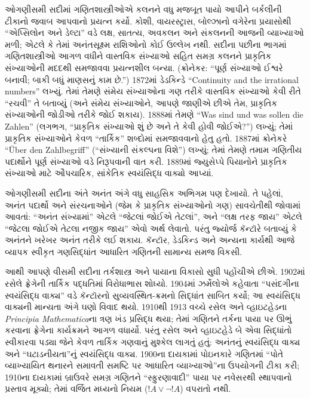 ઓગણીસમી સદીમાં ગણિતશાસ્ત્રીઓએ કલનને વધુ મજબૂત પાયો
આપીને બર્કલીની ટીકાનો જવાબ આપવાનો પ્રયત્ન કર્યો.
કોશી, વાયરસ્ટ્રાસ, બોલ્ઝાનો વગેરેના પ્રયાસોથી
``એપ્સિલોન અને ડેલ્ટા'' વડે લક્ષ, સાતત્ય,
અવકલન અને સંકલનની આજની વ્યાખ્યાઓ મળી; એટલે કે
તેમાં અનંતસૂક્ષ્મ રાશિઓનો કોઈ ઉલ્લેખ નથી. સદીના
પછીના ભાગમાં ગણિતશાસ્ત્રીઓ આગળ વધીને વાસ્તવિક
સંખ્યાઓ સહિત સમગ્ર કલનને પ્રાકૃતિક સંખ્યાઓની મદદથી
સમજાવવા પ્રયત્નશીલ બન્યા. (ક્રોનેકર: ``પૂર્ણ સંખ્યાઓ
ઈશ્વરે બનાવી; બાકી બધું માણસનું કામ છે.'') 1872માં
ડેડકિન્ડે ``Continuity and the irrational numbers''
લખ્યું. તેમાં તેમણે સંમેય સંખ્યાઓના ગણ તરીકે વાસ્તવિક
સંખ્યાઓ કેવી રીતે ``રચવી'' તે બતાવ્યું (અને સંમેય
સંખ્યાઓને, આપણે જાણીએ છીએ તેમ, પ્રાકૃતિક સંખ્યાઓની
જોડીઓ તરીકે જોઈ શકાય). 1888માં તેમણે ``Was sind und
was sollen die Zahlen'' (લગભગ, ``પ્રાકૃતિક સંખ્યાઓ
શું છે અને તે કેવી હોવી જોઈએ?'') લખ્યું; તેમાં
પ્રાકૃતિક સંખ્યાઓને કેવળ ``તાર્કિક'' શબ્દોમાં સમજાવવાનો
હેતુ હતો. 1887માં ક્રોનેકરે ``\"Uber den Zahlbegriff''
(``સંખ્યાની સંકલ્પના વિશે'') લખ્યું; તેમાં તેમણે તમામ
ગણિતીય પદાર્થોને પૂર્ણ સંખ્યાઓ વડે નિરૂપવાની વાત કરી.
1889માં જ્યુસેપ્પે પિયાનોને પ્રાકૃતિક સંખ્યાઓ માટે
ઔપચારિક, સાંકેતિક સ્વયંસિદ્ધ વાક્યો આપ્યાં.

ઓગણીસમી સદીના અંતે અનંત અંગે વધુ સાહસિક અભિગમ પણ
દેખાયો. તે પહેલાં, અનંત પદાર્થો અને સંરચનાઓને
(જેમ કે પ્રાકૃતિક સંખ્યાઓનો ગણ) સાવચેતીથી જોવામાં
આવતાં: ``અનંત સંખ્યામાં'' એટલે ``જેટલાં જોઈએ તેટલાં'',
અને ``લક્ષ તરફ જાય'' એટલે ``જેટલા જોઈએ તેટલા નજીક
જાય'' એવો અર્થ લેવાતો. પરંતુ જ્યોર્જ કૅન્ટૉરે બતાવ્યું
કે અનંતને ખરેખર અનંત તરીકે લઈ શકાય. કૅન્ટૉર,
ડેડકિન્ડ અને અન્યના કાર્યથી આજે વ્યાપક સ્વીકૃત
ગણસિદ્ધાંત આધારિત ગણિતની સામાન્ય સમજ વિકસી.

આથી આપણે વીસમી સદીના તર્કશાસ્ત્ર અને પાયાના વિકાસો
સુધી પહોંચીએ છીએ. 1902માં રસેલે ફ્રેગેની તાર્કિક
પદ્ધતિમાં વિરોધાભાસ શોધ્યો. 1904માં ઝર્મેલોએ
કહેવાતા ``પસંદગીના સ્વયંસિદ્ધ વાક્ય'' વડે કૅન્ટૉરનો
સુવ્યવસ્થિત-ક્રમનો સિદ્ધાંત સાબિત કર્યો; આ સ્વયંસિદ્ધ
વાક્યની માન્યતા અંગે ઘણો વિવાદ થયો. 1910થી 1913
વચ્ચે રસેલ અને વ્હાઇટહેડના \emph{Principia Mathematica}ના
ત્રણ ખંડ પ્રસિદ્ધ થયા; તેમાં ગણિતને તર્કના પાયા પર
ઊભું કરવાના ફ્રેગેના કાર્યક્રમને આગળ વધાર્યો. પરંતુ
રસેલ અને વ્હાઇટહેડે બે એવા સિદ્ધાંતો સ્વીકારવા પડ્યા
જેને કેવળ તાર્કિક ગણવાનું મુશ્કેલ લાગતું હતું:
અનંતનું સ્વયંસિદ્ધ વાક્ય અને ``ઘટાડનીયતા''નું
સ્વયંસિદ્ધ વાક્ય. 1900ના દાયકામાં પોઇનકારે ગણિતમાં
``પોતે વ્યાખ્યાયિત થનારને સમાવતી સમષ્ટિ પર આધારિત
વ્યાખ્યાઓ''ના ઉપયોગની ટીકા કરી;
1910ના દાયકામાં બ્રાઉવરે સમગ્ર ગણિતને ``સ્ફુરણાવાદી''
પાયા પર નવેસરથી સ્થાપવાનો પ્રસ્તાવ મૂક્યો; તેમાં
વર્જિત મધ્યનો નિયમ ($!A \lor \lnot !A$) વપરાતો નથી.

